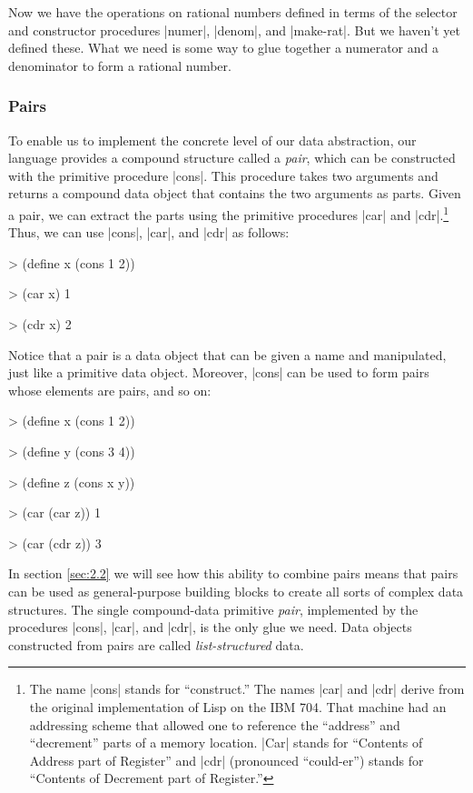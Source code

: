 Now we have the operations on rational numbers defined in terms of the
selector and constructor procedures
\scheme|numer|, \scheme|denom|, and \scheme|make-rat|.
But we haven't yet defined these.
What we need is some way to glue together a numerator and a
denominator to form a rational
number.


\subsubsection*{Pairs}

To enable us to implement the concrete level of our data abstraction,
our language provides a compound structure called a \textit{pair},
which can be constructed with the primitive procedure \scheme|cons|.
This procedure takes two arguments and returns a compound data object
that contains the two arguments as parts.  Given a pair, we can
extract the parts using the primitive procedures \scheme|car| and
\scheme|cdr|.\footnote{The name \scheme|cons| stands for
  ``construct.''  The names \scheme|car| and \scheme|cdr| derive from
  the original implementation of Lisp on the IBM 704.  That machine
  had an addressing scheme that allowed one to reference the
  ``address'' and ``decrement'' parts of a memory location.
  \scheme|Car| stands for ``Contents of Address part of Register'' and
  \scheme|cdr| (pronounced ``could-er'') stands for ``Contents of
  Decrement part of Register.''} Thus, we can use \scheme|cons|,
\scheme|car|, and \scheme|cdr| as follows:

\begin{schemedisplay}
> (define x (cons 1 2))

> (car x)
1

> (cdr x)
2
\end{schemedisplay}

Notice that a pair is a data object that can be given a name and
manipulated, just like a primitive data object.  Moreover, \scheme|cons|
can be used to form pairs whose elements are pairs, and so on:


\begin{schemedisplay}
> (define x (cons 1 2))

> (define y (cons 3 4))

> (define z (cons x y))

> (car (car z))
1

> (car (cdr z))
3
\end{schemedisplay}
In section \ref{sec:2.2} we will see how this ability to
combine pairs means that pairs can be used as general-purpose building
blocks to create all sorts of complex data structures.  The single
compound-data primitive \textit{pair}, implemented by the procedures \scheme|cons|, \scheme|car|, and \scheme|cdr|, is the only glue we need.  Data
objects constructed from pairs are called \textit{list-structured} data.


